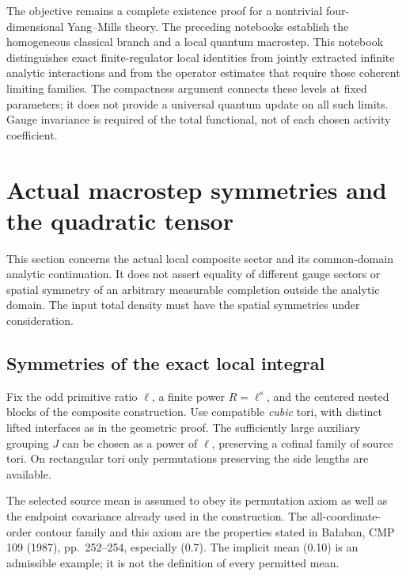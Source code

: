 \documentclass[11pt]{article}
\theoremstyle{remark}
\begin{document}
The objective remains a complete existence proof for a nontrivial
four-dimensional Yang--Mills theory. The preceding notebooks establish
the homogeneous classical branch and a local quantum macrostep.
This notebook distinguishes exact finite-regulator local identities
from jointly extracted infinite analytic interactions and from the
operator estimates that require those coherent limiting families.
The compactness argument connects these levels at fixed parameters;
it does not provide a universal quantum update on all such limits.
Gauge invariance is required of the total functional,
not of each chosen activity coefficient.


\section{Actual macrostep symmetries and the quadratic tensor}
\label{msy-section}

This section concerns the actual local composite sector and its
common-domain analytic continuation. It does not assert equality of
different gauge sectors or spatial symmetry of an arbitrary measurable
completion outside the analytic domain. The input total density must
have the spatial symmetries under consideration.

\subsection{Symmetries of the exact local integral}
\label{msy-integral-section}

Fix the odd primitive ratio \(\ell\), a finite power \(R=\ell^s\), and
the centered nested blocks of the composite construction. Use compatible
\emph{cubic} tori, with distinct lifted interfaces as in the geometric
proof. The sufficiently large auxiliary grouping \(J\) can be chosen
as a power of \(\ell\), preserving a cofinal family of source tori.
On rectangular tori only permutations preserving the side lengths
are available.

The selected source mean is assumed to obey its permutation axiom
as well as the endpoint covariance already used in the construction.
The all-coordinate-order contour family and this axiom are the
properties stated in Ba{\l}aban, CMP 109 (1987), pp.~252--254,
especially (0.7). The implicit mean (0.10) is an admissible example;
it is not the definition of every permitted mean.
\end{document}
